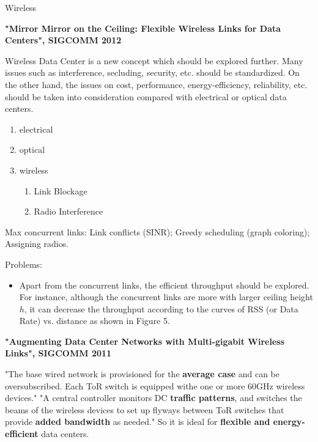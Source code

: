 \documentclass[journal,onecolumn,11pt]{IEEEtran}
\begin{document}
Wireless

\textbf{"Mirror Mirror on the Ceiling: Flexible Wireless Links for Data Centers", SIGCOMM 2012}

Wireless Data Center is a new concept which should be explored further. Many issues such as interference, secluding, security, etc. should be standardized. On the other hand, the issues on cost, performance, energy-efficiency, reliability, etc. should be taken into consideration compared with electrical or optical data centers.


\begin{enumerate}
  \item electrical
  \item optical
  \item wireless
  \begin{enumerate}
    \item Link Blockage
    \item Radio Interference
  \end{enumerate}
\end{enumerate}

Max concurrent links: Link conflicts (SINR); Greedy scheduling (graph coloring); Assigning radios.

Problems:
\begin{itemize}
  \item Apart from the concurrent links, the efficient throughput should be explored. For instance, although the concurrent links are more with larger ceiling height $h$, it can decrease the throughput according to the curves of RSS (or Data Rate) vs. distance as shown in Figure 5.
\end{itemize}


\textbf{"Augmenting Data Center Networks with Multi-gigabit Wireless Links", SIGCOMM 2011}

"The base wired network is provisioned for the \textbf{average case} and can be oversubscribed. Each ToR switch is equipped withe one or more 60GHz wireless devices." "A central controller monitors DC \textbf{traffic patterns}, and switches the beams of the wireless devices to set up flyways between ToR switches that provide \textbf{added bandwidth} as needed." So it is ideal for \textbf{flexible and energy-efficient} data centers.
\end{document}
